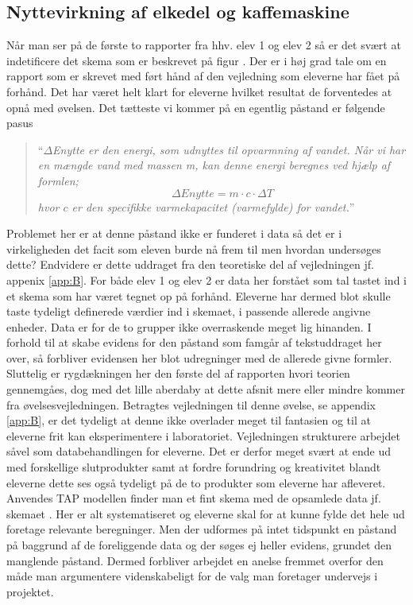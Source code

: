 \subsection*{Nyttevirkning af elkedel og kaffemaskine}
Når man ser på de første to rapporter fra hhv. elev 1 og elev 2 så er det svært at indetificere det skema som er beskrevet på figur . Der er i høj grad tale om en rapport som er skrevet med ført hånd af den vejledning som eleverne har fået på forhånd. Det har været helt klart for eleverne hvilket resultat de forventedes at opnå med øvelsen. Det tætteste vi kommer på en egentlig påstand er følgende pasus
\begin{quote}
	``\emph{$\Delta$Enytte er den energi, som udnyttes til opvarmning af vandet. Når vi har en mængde vand med massen m, kan denne energi beregnes ved hjælp af formlen;
	\begin{equation*}
	\Delta Enytte = m\cdot c\cdot \Delta T
	\end{equation*}
	hvor $c$ er den specifikke varmekapacitet (varmefylde) for vandet.}''
\end{quote}
Problemet her er at denne påstand ikke er funderet i data så det er i virkeligheden det facit som eleven burde nå frem til men hvordan undersøges dette? Endvidere er dette uddraget fra den teoretiske del af vejledningen jf. appenix \vref{app:B}. For både elev 1 og elev 2 er data her forstået som tal tastet ind i et skema som har været tegnet op på forhånd. Eleverne har dermed blot skulle taste tydeligt definerede værdier ind i skemaet, i passende allerede angivne enheder. Data er for de to grupper ikke overraskende meget lig hinanden. I forhold til at skabe evidens for den påstand som famgår af tekstuddraget her over, så forbliver evidensen her blot udregninger med de allerede givne formler. Sluttelig er rygdækningen her den første del af rapporten hvori teorien gennemgåes, dog med det lille aberdaby at dette afsnit mere eller mindre kommer fra øvelsesvejledningen. Betragtes vejledningen til denne øvelse, se appendix \vref{app:B}, er det tydeligt at denne ikke overlader meget til fantasien og til at eleverne frit kan eksperimentere i laboratoriet. Vejledningen strukturere arbejdet såvel som databehandlingen for eleverne. Det er derfor meget svært at ende ud med forskellige slutprodukter samt at fordre forundring og kreativitet blandt eleverne dette ses også tydeligt på de to produkter som eleverne har afleveret. 
Anvendes TAP modellen finder man et fint skema med de opsamlede data jf. skemaet . Her er alt systematiseret og eleverne skal for at kunne fylde det hele ud foretage relevante beregninger. 
Men der udformes på intet tidspunkt en påstand på baggrund af de foreliggende data og der søges ej heller evidens, grundet den manglende påstand. Dermed forbliver arbejdet en anelse fremmet overfor den måde man argumentere videnskabeligt for de valg man foretager undervejs i projektet. 

